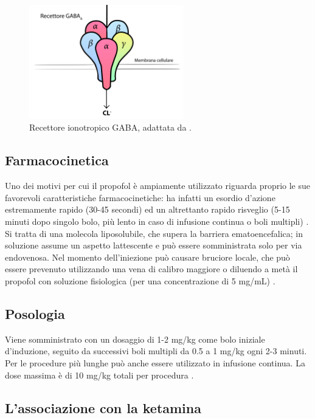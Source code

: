 \bigskip

\begin{figure}[h]
    \centering
    \includegraphics[width=0.6\textwidth]{Figure/GABAps.jpg}
    \caption{Recettore ionotropico GABA, adattata da \cite{vinkers2012}.}
    \label{fig:GABAps}
\end{figure}

\subsection*{Farmacocinetica}

Uno dei motivi per cui il propofol è ampiamente utilizzato riguarda proprio le sue favorevoli caratteristiche farmacocinetiche: ha infatti un esordio d'azione estremamente rapido (30-45 secondi) ed un altrettanto rapido risveglio (5-15 minuti dopo singolo bolo, più lento in caso di infusione continua o boli multipli) \cite{Simeupsedazione, Uptodatepharmacology}. Si tratta di una molecola liposolubile, che supera la barriera ematoencefalica; in soluzione assume un aspetto lattescente e può essere somministrata solo per via endovenosa. Nel momento dell'iniezione può causare bruciore locale, che può essere prevenuto utilizzando una vena di calibro maggiore o diluendo a metà il propofol con soluzione fisiologica (per una concentrazione di 5 mg/mL) \cite{Simeupsedazione}. 

\subsection*{Posologia}

Viene somministrato con un dosaggio di 1-2 mg/kg come bolo iniziale d'induzione, seguito da successivi boli multipli da 0.5 a 1 mg/kg ogni 2-3 minuti. Per le procedure più lunghe può anche essere utilizzato in infusione continua.
La dose massima è di 10 mg/kg totali per procedura \cite{Simeupsedazione}.

\subsection*{L'associazione con la ketamina}

